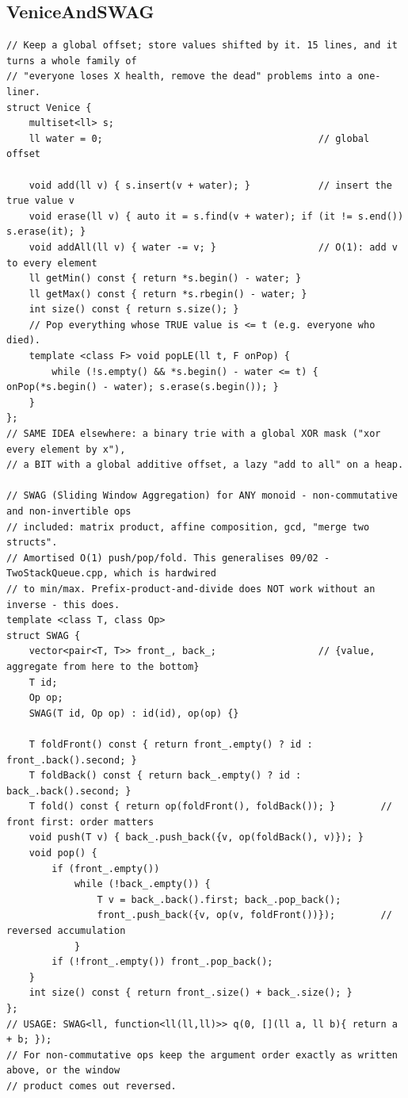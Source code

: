 \documentclass[9pt,a4paper,twocolumn]{extarticle}
\begin{document}
\filbreak
\subsection{VeniceAndSWAG}
\nopagebreak
\begin{lstlisting}
// Keep a global offset; store values shifted by it. 15 lines, and it turns a whole family of
// "everyone loses X health, remove the dead" problems into a one-liner.
struct Venice {
    multiset<ll> s;
    ll water = 0;                                      // global offset

    void add(ll v) { s.insert(v + water); }            // insert the true value v
    void erase(ll v) { auto it = s.find(v + water); if (it != s.end()) s.erase(it); }
    void addAll(ll v) { water -= v; }                  // O(1): add v to every element
    ll getMin() const { return *s.begin() - water; }
    ll getMax() const { return *s.rbegin() - water; }
    int size() const { return s.size(); }
    // Pop everything whose TRUE value is <= t (e.g. everyone who died).
    template <class F> void popLE(ll t, F onPop) {
        while (!s.empty() && *s.begin() - water <= t) { onPop(*s.begin() - water); s.erase(s.begin()); }
    }
};
// SAME IDEA elsewhere: a binary trie with a global XOR mask ("xor every element by x"),
// a BIT with a global additive offset, a lazy "add to all" on a heap.

// SWAG (Sliding Window Aggregation) for ANY monoid - non-commutative and non-invertible ops
// included: matrix product, affine composition, gcd, "merge two structs".
// Amortised O(1) push/pop/fold. This generalises 09/02 - TwoStackQueue.cpp, which is hardwired
// to min/max. Prefix-product-and-divide does NOT work without an inverse - this does.
template <class T, class Op>
struct SWAG {
    vector<pair<T, T>> front_, back_;                  // {value, aggregate from here to the bottom}
    T id;
    Op op;
    SWAG(T id, Op op) : id(id), op(op) {}

    T foldFront() const { return front_.empty() ? id : front_.back().second; }
    T foldBack() const { return back_.empty() ? id : back_.back().second; }
    T fold() const { return op(foldFront(), foldBack()); }        // front first: order matters
    void push(T v) { back_.push_back({v, op(foldBack(), v)}); }
    void pop() {
        if (front_.empty())
            while (!back_.empty()) {
                T v = back_.back().first; back_.pop_back();
                front_.push_back({v, op(v, foldFront())});        // reversed accumulation
            }
        if (!front_.empty()) front_.pop_back();
    }
    int size() const { return front_.size() + back_.size(); }
};
// USAGE: SWAG<ll, function<ll(ll,ll)>> q(0, [](ll a, ll b){ return a + b; });
// For non-commutative ops keep the argument order exactly as written above, or the window
// product comes out reversed.
\end{lstlisting}
\end{document}
